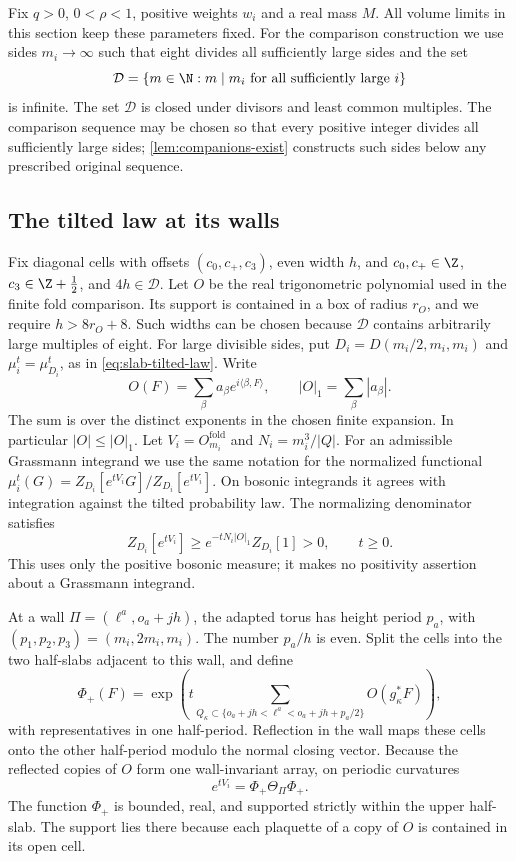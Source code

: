 Fix $q>0$, $0<\rho<1$, positive weights $w_i$ and a real mass $M$.
All volume limits in this section keep these parameters fixed. For the comparison construction we
use sides $m_i\to\infty$ such that eight divides all sufficiently
large sides and the set
\[
 \mathcal D=\{m\in\N:m\mid m_i\text{ for all sufficiently large }i\}
\]
is infinite. The set $\mathcal D$ is closed under divisors and least
common multiples. The comparison sequence may be chosen so that every positive integer
divides all sufficiently large sides; \cref{lem:companions-exist}
constructs such sides below any prescribed original sequence.

\subsection{The tilted law at its walls}\label{subsec:diag-wall-law}

Fix diagonal cells with offsets $(c_0,c_+,c_3)$, even width $h$, and
$c_0,c_+\in\Z$, $c_3\in\Z+\tfrac12$, and $4h\in\mathcal D$.
Let $O$ be the real trigonometric polynomial used in the finite fold
comparison. Its support is contained in a box of radius $r_O$, and
we require $h>8r_O+8$. Such widths can be chosen because
$\mathcal D$ contains arbitrarily large multiples of eight. For
large divisible sides, put $D_i=D(m_i/2,m_i,m_i)$ and
$\mu_i^t=\mu_{D_i}^t$, as in \eqref{eq:slab-tilted-law}. Write
\[
 O(F)=\sum_\beta a_\beta e^{i\langle\beta,F\rangle},
 \qquad |O|_1=\sum_\beta|a_\beta|.
\]
The sum is over the distinct exponents in the chosen finite expansion.
In particular $|O|\le|O|_1$. Let $V_i=O_{m_i}^{\mathrm{fold}}$ and
$N_i=m_i^3/|Q|$. For an admissible Grassmann integrand we use
the same notation for the normalized functional
$\mu_i^t(G)=Z_{D_i}[e^{tV_i}G]/Z_{D_i}[e^{tV_i}]$.
On bosonic integrands it agrees with integration against the
tilted probability law. The normalizing denominator satisfies
\begin{equation}\label{eq:diag-tilt-denominator}
 Z_{D_i}[e^{tV_i}]\ge e^{-tN_i|O|_1}Z_{D_i}[1]>0,
 \qquad t\ge0.
\end{equation}
This uses only the positive bosonic measure; it makes no positivity
assertion about a Grassmann integrand.

At a wall $\Pi=(\ell^a,o_a+jh)$, the adapted torus has height period
$p_a$, with $(p_1,p_2,p_3)=(m_i,2m_i,m_i)$. The number $p_a/h$ is
even. Split the cells into the two half-slabs adjacent to this wall,
and define
\[
 \Phi_+(F)=\exp\left(t\sum_{Q_\kappa\subset
              \{o_a+jh<\ell^a<o_a+jh+p_a/2\}}O(g_\kappa^*F)\right),
\]
with representatives in one half-period. Reflection in the wall
maps these cells onto the other half-period modulo the normal closing
vector. Because the reflected copies of $O$ form one wall-invariant
array, on periodic curvatures
\begin{equation}\label{eq:diag-wall-factorization}
 e^{tV_i}=\Phi_+\Theta_\Pi\Phi_+.
\end{equation}
The function $\Phi_+$ is bounded, real, and supported strictly within
the upper half-slab. The support lies there because each plaquette
of a copy of $O$ is contained in its open cell.


